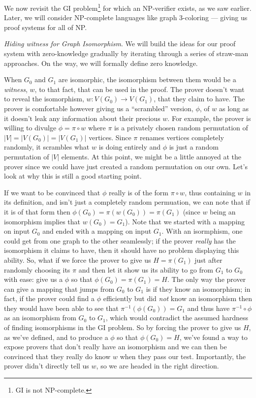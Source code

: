 	We now revisit the GI problem\footnote{GI is not NP-complete.} for which an NP-verifier exists, as we saw earlier. Later, we will consider NP-complete languages like graph 3-coloring --- giving us proof systems for all of NP. \smallskip

	\noindent \textit{Hiding witness for Graph Isomorphism}. We will build the ideas for our proof system with zero-knowledge gradually by iterating through a series of straw-man approaches. On the way, we will formally define zero knowledge. 

	When $G_0$ and $G_1$ are isomorphic, the isomorphism between them would be a \textit{witness}, $w$, to that fact, that can be used in the proof.  The prover doesn't want to reveal the isomorphism, $w:V(G_0)\rightarrow V(G_1)$, that they claim to have.  The prover is comfortable however giving us a ``scrambled'' version, $\phi$, of $w$ as long as it doesn't leak any information about their precious $w$.  For example, the prover is willing to divulge $\phi = \pi \circ w$ where $\pi$ is a privately chosen random permutation of $|V|=|V(G_0)|=|V(G_1)|$ vertices.  Since $\pi$ renames vertices completely randomly, it scrambles what $w$ is doing entirely and $\phi$ is just a random permutation of $|V|$ elements.  At this point, we might be a little annoyed at the prover since we could have just created a random permutation on our own.  Let's look at why this is still a good starting point.
		
	If we want to be convinced that $\phi$ really is of the form $\pi \circ w$, thus containing $w$ in its definition, and isn't just a completely random permuation, we can note that if it is of that form then $\phi(G_0)=\pi(w(G_0))=\pi(G_1)$ (since $w$ being an isomorphism implies that $w(G_0)=G_1$).  Note that we started with a mapping on input $G_0$ and ended with a mapping on input $G_1$.  With an isormphism, one could get from one graph to the other seamlessly; if the prover \textit{really} has the isomorphism it claims to have, then it should have no problem displaying this ability.  So, what if we force the prover to give us $H=\pi (G_1)$ just after randomly choosing its $\pi$ and then let it show us its ability to go from $G_1$ to $G_0$ with ease: give us a $\phi$ so that $\phi(G_0)=\pi(G_1)=H$.  The only way the prover can give a mapping that jumps from $G_0$ to $G_1$ is if they know an isomorphism; in fact, if the prover could find a $\phi$ efficiently but did \textit{not} know an isomorphism then they would have been able to see that $\pi^{-1}(\phi(G_0))=G_1$ and thus have $\pi^{-1}\circ\phi$ as an isomorphism from $G_0$ to $G_1$, which would contradict the assumed hardness of finding isomorphisms in the GI problem. So by forcing the prover to give us $H$, as we've defined, and to produce a $\phi$ so that $\phi(G_0)=H$, we've found a way to expose provers that don't really have an isomorphism and we can then be convinced that they really do know $w$ when they pass our test.  Importantly, the prover didn't directly tell us $w$, so we are headed in the right direction.
		
